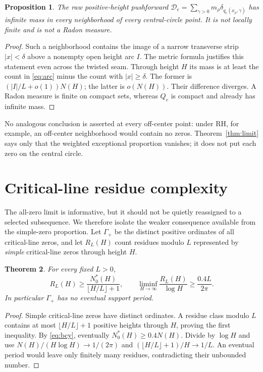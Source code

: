 \documentclass[11pt,a4paper]{article}
\newtheorem{theorem}{Theorem}[section]
\newtheorem{proposition}[theorem]{Proposition}
\theoremstyle{definition}
\theoremstyle{remark}
\begin{document}
\begin{proposition}\label{prop:raw}
The raw positive-height pushforward
$\mathcal D_e=\sum_{\gamma>0}m_\rho\delta_{q_e(x_\rho,\gamma)}$
has infinite mass in every neighborhood of every central-circle point.
It is not locally finite and is not a Radon measure.
\end{proposition}
\begin{proof}
Such a neighborhood contains the image of a narrow transverse strip
$|x|<\delta$ above a nonempty open height arc $I$. The metric formula justifies
this statement even across the twisted seam. Through height $H$ its mass is
at least the count in \eqref{eq:arc} minus the count with $|x|\ge\delta$.
The former is $(|I|/L+o(1))N(H)$; the latter is $o(N(H))$. Their difference
diverges. A Radon measure is finite on compact sets, whereas $Q_e$ is compact
and already has infinite mass.
\end{proof}

No analogous conclusion is asserted at every off-center point: under RH, for
example, an off-center neighborhood would contain no zeros. Theorem~\ref{thm:limit}
says only that the weighted exceptional proportion vanishes; it does not put
each zero on the central circle.

\section{Critical-line residue complexity}\label{sec:critical}

The all-zero limit is informative, but it should not be quietly reassigned to
a selected subsequence. We therefore isolate the weaker consequence available
from the simple-zero proportion. Let $\Gamma_+$ be the distinct positive
ordinates of all critical-line zeros, and let $R_L(H)$ count residues modulo $L$ represented by
\emph{simple} critical-line zeros through height $H$.

\begin{theorem}\label{thm:residue}
For every fixed $L>0$,
\begin{equation}\label{eq:residue}
 R_L(H)\ge\frac{N_0^*(H)}{\lfloor H/L\rfloor+1},\qquad
 \liminf_{H\to\infty}\frac{R_L(H)}{\log H}
        \ge\frac{0.4L}{2\pi}.
\end{equation}
In particular $\Gamma_+$ has no eventual support period.
\end{theorem}
\begin{proof}
Simple critical-line zeros have distinct ordinates. A residue class modulo
$L$ contains at most $\lfloor H/L\rfloor+1$ positive heights through $H$,
proving the first inequality. By \eqref{eq:bcy}, eventually
$N_0^*(H)\ge0.4N(H)$. Divide by $\log H$ and use
$N(H)/(H\log H)\to1/(2\pi)$ and
$(\lfloor H/L\rfloor+1)/H\to1/L$. An eventual period would leave only
finitely many residues, contradicting their unbounded number.
\end{proof}
\end{document}
